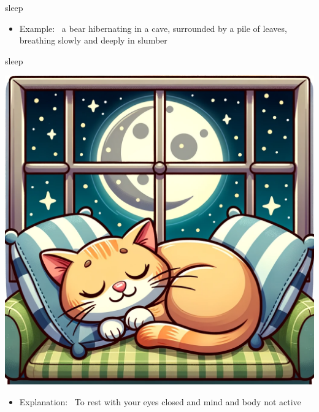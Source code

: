 \documentclass[avery5371, grid,frame]{flashcards}
\begin{document}
\begin{flashcard}{sleep}
\begin{center}
\begin{minipage}[c]{.45\textwidth}
\begin{itemize}
            \item Example: \ a bear hibernating in a cave, surrounded by a pile of leaves, breathing slowly and deeply in slumber
            \end{itemize}
        \end{minipage}
    \end{center}
    \vspace*{\fill}
\end{flashcard}\begin{flashcard}{sleep}
    \vspace*{\fill}
    \begin{center}
        \begin{minipage}[c]{.45\textwidth}
            \includegraphics[width=\textwidth]{cards/s/sleep/sleep - a cat curled up, peacefully sleeping on a cushion with a moonlit window in the background.png}
        \end{minipage}
        \begin{minipage}[c]{.45\textwidth}
            \begin{itemize}\setlength\itemsep{12pt}
            \item Explanation: \ To rest with your eyes closed and mind and body not active


\end{itemize}
\end{minipage}
\end{center}
\end{flashcard}
\end{document}

